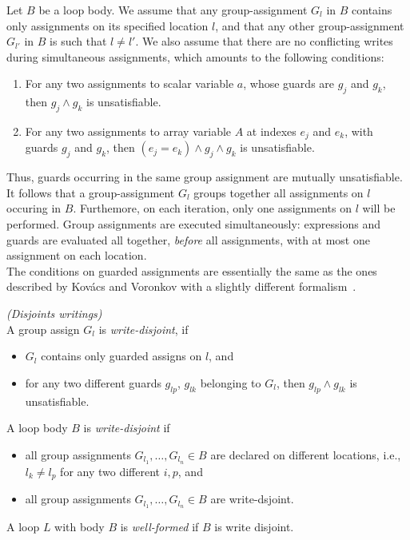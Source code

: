 \documentclass[a4paper,10pt]{article}
\newenvironment{definition}[1][Definition]{\begin{trivlist}
\item[\hskip \labelsep {\bfseries #1}]}{\end{trivlist}}
\begin{document}
Let ${ B}$ be a loop body. We assume that any group-assignment $G_l$ in ${ B}$ 
contains only assignments on its specified location $l$, and that any other 
group-assignment $G_{l'}$ in ${ B}$ is such that $l \neq l'$. We also assume 
that there are no conflicting writes during simultaneous assignments,
which amounts to the following conditions:
\begin{enumerate}
\item For any two assignments to scalar variable $a$, whose guards are $g_j$
  and $g_k$, then $g_j \land g_k$ is unsatisfiable.
\item For any two assignments to array variable $A$ at indexes $e_j$ and $e_k$,
  with guards $g_j$ and $g_k$, then $(e_j = e_k) \land g_j \land g_k$ is
  unsatisfiable.
\end{enumerate}
Thus, guards occurring in the same group assignment are mutually unsatisfiable. 
It follows that a group-assignment $G_l$ groups together all assignments on $l$ 
occuring in ${ B}$. Furthemore, on each iteration, only one assignments on $l$ will be performed.
Group assignments are executed simultaneously: expressions and guards are evaluated all together, 
\textit{before} all assignments, with at most one assignment on each location.\\
The conditions on guarded assignments are essentially the same as the ones described by Kov\'acs 
and Voronkov with a slightly different formalism~\cite{kovacs:2009:fli}.

\begin{definition} \emph{(Disjoints writings)}\\
A group assign $G_l$ is \textit{write-disjoint}, if 
\begin{itemize}
\item[i.] $G_l$  contains only guarded assigns on $l$, and
\item[ii.] for any two different guards $g_{lp}$, $g_{lk}$ belonging to $G_l$,
           then $g_{lp} \land g_{lk}$ is unsatisfiable.
\end{itemize}
A loop body $B$ is \textit{write-disjoint} if 
\begin{itemize}
\item[i.] all group assignments $G_{l_1}, \ldots, G_{l_n} \in B$ are declared 
          on different locations, i.e., $l_k \neq l_p$ for any two different $i,p$, and
\item[ii.] all group assignments $G_{l_1}, \ldots, G_{l_n} \in B$ are write-dsjoint.
\end{itemize}
A loop $L$ with body $B$ is \textit{well-formed} if $B$ is write disjoint.
\end{definition}
\end{document}
